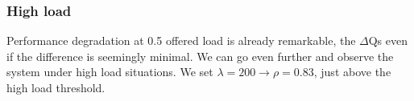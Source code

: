     
\subsubsection{High load}
    Performance degradation at 0.5 offered load is already remarkable, the $\Delta$Qs even if the difference is seemingly minimal. We can go even further and observe the system under high load situations. We set $\lambda = 200 \rightarrow \rho = 0.83$, just above the high load threshold.
    
